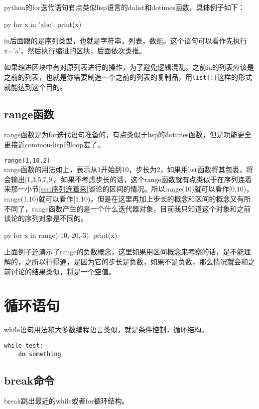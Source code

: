 \documentclass[12pt,oneside]{book}
\begin{document}
\begin{common-format}
python的for迭代语句有点类似lisp语言的dolist和dotimes函数，具体例子如下：
\begin{xverbatim}[129]{py}
for x in 'abc':
    print(x)
\end{xverbatim}
in后面跟的是序列类型，也就是字符串，列表，数组。这个语句可以看作先执行x='a'，然后执行缩进的区块，后面依次类推。

如果缩进区块中有对原列表进行的操作，为了避免逻辑混乱，之前in的列表应该是之前的列表，也就是你需要制造一个之前的列表的复制品，用\verb+list[:]+这样的形式就能达到这个目的。

\subsection{range函数}
range函数是为for迭代语句准备的，有点类似于lisp的dotimes函数，但是功能更全更接近common-lisp的loop宏了。

\verb+range(1,10,2)+\\
range函数的用法如上，表示从1开始到10，步长为2，如果用list函数将其包裹，将会输出[1,3,5,7,9]。如果不考虑步长的话，这个range函数就有点类似于在序列连着来那一小节\ref{sec:序列连着来}谈论的区间的情况。所以range(10)就可以看作[0,10)，range(1,10)就可以看作[1,10)。但是在这里再加上步长的概念和区间的概念又有所不同了，range函数产生的是一个什么迭代器对象，目前我只知道这个对象和之前谈论的序列对象是不同的。

\begin{xverbatim}[129]{py}
for x in range(-10,-20,-3):
    print(x)
\end{xverbatim}
上面例子还演示了range的负数概念，这里如果用区间概念来考察的话，是不能理解的，之所以行得通，是因为它的步长是负数，如果不是负数，那么情况就会和之前讨论的结果类似，将是一个空值。







\section{循环语句}
while语句用法和大多数编程语言类似，就是条件控制，循环结构。
\begin{Verbatim}
while test:
    do something
\end{Verbatim}

\subsection{break命令}
break跳出最近的while或者for循环结构。


\end{common-format}
\end{document}
